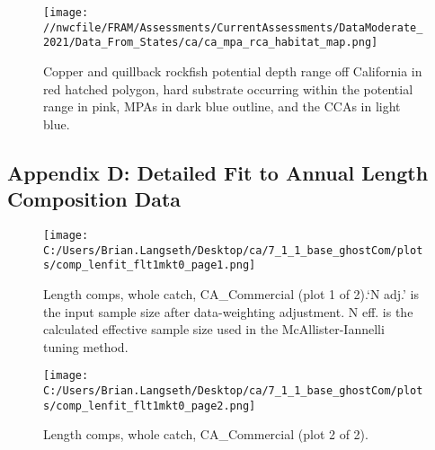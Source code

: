 \documentclass[11pt,
  english,
  letterpaper,
]{article}
\begin{document}

\begin{figure}
\centering
\texttt{[image: //nwcfile/FRAM/Assessments/CurrentAssessments/DataModerate\_2021/Data\_From\_States/ca/ca\_mpa\_rca\_habitat\_map.png]}
\caption{Copper and quillback rockfish potential depth range off California in red hatched polygon, hard substrate occurring within the potential range in pink, MPAs in dark blue outline, and the CCAs in light blue.\label{fig:ca-mpa-map}}
\end{figure}

\tagmcend\tagstructend

\clearpage


\hypertarget{append_d}{%
\subsection{Appendix D: Detailed Fit to Annual Length Composition Data}\label{append_d}}

\leavevmode\tagmcend\tagstructend


\begin{figure}
\centering
\texttt{[image: C:/Users/Brian.Langseth/Desktop/ca/7\_1\_1\_base\_ghostCom/plots/comp\_lenfit\_flt1mkt0\_page1.png]}
\caption{Length comps, whole catch, CA\_Commercial (plot 1 of 2).`N adj.' is the input sample size after data-weighting adjustment. N eff. is the calculated effective sample size used in the McAllister-Iannelli tuning method.\label{fig:comp_lenfit_flt1mkt0_page1}}
\end{figure}

\tagmcend\tagstructend


\begin{figure}
\centering
\texttt{[image: C:/Users/Brian.Langseth/Desktop/ca/7\_1\_1\_base\_ghostCom/plots/comp\_lenfit\_flt1mkt0\_page2.png]}
\caption{Length comps, whole catch, CA\_Commercial (plot 2 of 2).\label{fig:comp_lenfit_flt1mkt0_page2}}
\end{figure}
\end{document}
